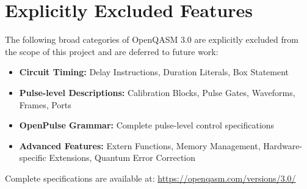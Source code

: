 \section{Explicitly Excluded Features}

The following broad categories of OpenQASM 3.0 are explicitly excluded from the scope of this project and are deferred to future work:

\begin{itemize}
    \item \textbf{Circuit Timing:} Delay Instructions, Duration Literals, Box Statement
    \item \textbf{Pulse-level Descriptions:} Calibration Blocks, Pulse Gates, Waveforms, Frames, Ports
    \item \textbf{OpenPulse Grammar:} Complete pulse-level control specifications
    \item \textbf{Advanced Features:} Extern Functions, Memory Management, Hardware-specific Extensions, Quantum Error Correction
\end{itemize}

\noindent Complete specifications are available at: \url{https://openqasm.com/versions/3.0/}